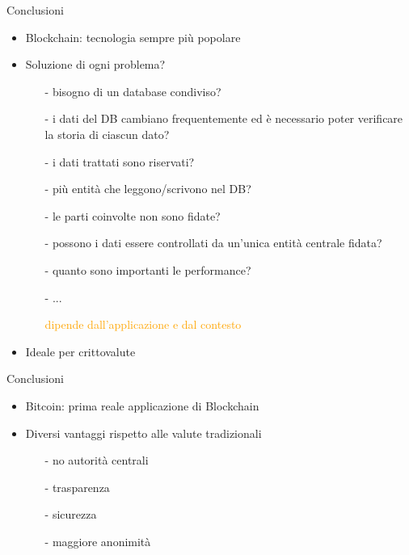 \documentclass{beamer}
\begin{document}
  
  
  \begin{frame}{Conclusioni}
      \begin{itemize}
          \item Blockchain: tecnologia sempre più popolare 
          \item Soluzione di ogni problema?  
          \begin{itemize}
              \item[-] bisogno di un database condiviso? 
              \item[-] i dati del DB cambiano frequentemente ed è necessario poter verificare la storia di ciascun dato? 
              \item[-] i dati trattati sono riservati? 
              \item[-] più entità che leggono/scrivono nel DB? 
              \item[-] le parti coinvolte non sono fidate? 
              \item[-] possono i dati essere controllati da un'unica entità centrale fidata? 
              \item[-] quanto sono importanti le performance? 
              \item[-] ...
              \item[\MVRightarrow] \textcolor{orange}{dipende dall'applicazione e dal contesto} 
          \end{itemize}
          \pause
          \item Ideale per crittovalute
      \end{itemize}
  \end{frame}
  
  
  
  
  \begin{frame}{Conclusioni}
      \begin{itemize}
          \item Bitcoin: prima reale applicazione di Blockchain
          \item Diversi vantaggi rispetto alle valute tradizionali 
          \begin{itemize}
              \item[-] no autorità centrali 
              \item[-] trasparenza
              \item[-] sicurezza
              \item[-] maggiore anonimità
          \end{itemize}
      \end{itemize}
  \end{frame}
  
\end{document}
